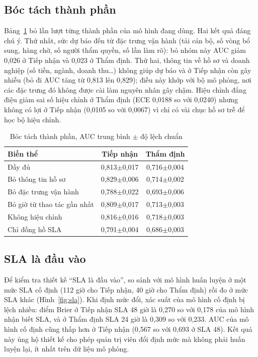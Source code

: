 \documentclass[journal]{IEEEtran}
\begin{document}
\subsection{Bóc tách thành phần}
Bảng~\ref{tab:abl} bỏ lần lượt từng thành phần của mô hình đang dùng. Hai kết quả đáng chú ý. Thứ nhất, sức dự báo đến từ đặc trưng vận hành (tải cán bộ, số vòng bổ sung, hàng chờ, số người thẩm quyền, số lần làm rõ): bỏ nhóm này AUC giảm 0,026 ở Tiếp nhận và 0,023 ở Thẩm định. Thứ hai, thông tin về hồ sơ và doanh nghiệp (số tiền, ngành, doanh thu\ldots) không giúp dự báo và ở Tiếp nhận còn gây nhiễu (bỏ đi AUC tăng từ 0,813 lên 0,829); điều này khớp với bộ mô phỏng, nơi các đặc trưng đó không được cài làm nguyên nhân gây chậm. Hiệu chỉnh đẳng điệu giảm sai số hiệu chỉnh ở Thẩm định (ECE 0,0188 so với 0,0240) nhưng không có lợi ở Tiếp nhận (0,0105 so với 0,0067) vì chỉ có vài chục hồ sơ trễ để học bộ hiệu chỉnh.

\begin{table}[t]
\caption{Bóc tách thành phần, AUC trung bình $\pm$ độ lệch chuẩn}
\label{tab:abl}
\centering
\small
\begin{tabular}{|l|c|c|}
\hline
Biến thể & Tiếp nhận & Thẩm định \\
\hline
Đầy đủ & 0,813$\pm$0,017 & 0,716$\pm$0,004 \\
Bỏ thông tin hồ sơ & 0,829$\pm$0,006 & 0,714$\pm$0,002 \\
Bỏ đặc trưng vận hành & 0,788$\pm$0,022 & 0,693$\pm$0,006 \\
Bỏ giờ từ thao tác gần nhất & 0,809$\pm$0,017 & 0,713$\pm$0,003 \\
Không hiệu chỉnh & 0,816$\pm$0,016 & 0,718$\pm$0,003 \\
Chỉ đồng hồ SLA & 0,791$\pm$0,004 & 0,686$\pm$0,003 \\
\hline
\end{tabular}
\end{table}

\subsection{SLA là đầu vào}
Để kiểm tra thiết kế ``SLA là đầu vào'', so sánh với mô hình huấn luyện ở một mức SLA cố định (112 giờ cho Tiếp nhận, 40 giờ cho Thẩm định) rồi đo ở mức SLA khác (Hình~\ref{fig:sla}). Khi định mức đổi, xác suất của mô hình cố định bị lệch nhiều: điểm Brier ở Tiếp nhận SLA 48 giờ là 0,270 so với 0,178 của mô hình nhận biết SLA, và ở Thẩm định SLA 24 giờ là 0,309 so với 0,233. AUC của mô hình cố định cũng thấp hơn ở Tiếp nhận (0,567 so với 0,693 ở SLA 48). Kết quả này ủng hộ thiết kế cho phép quản trị viên đổi định mức mà không phải huấn luyện lại, ít nhất trên dữ liệu mô phỏng.
\end{document}
